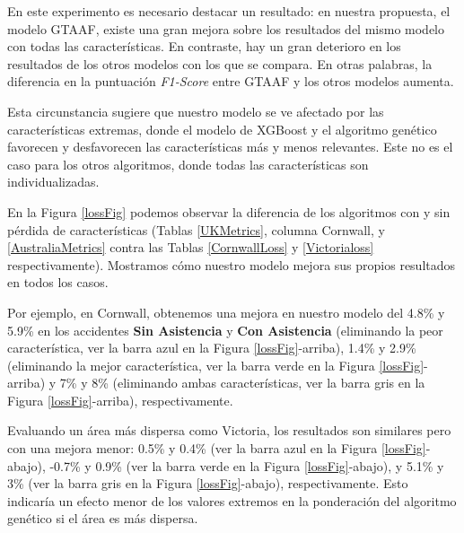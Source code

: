 En este experimento es necesario destacar un resultado: en nuestra propuesta, el modelo GTAAF, existe una gran mejora sobre los resultados del mismo modelo con todas las características. En contraste, hay un gran deterioro en los resultados de los otros modelos con los que se compara. En otras palabras, la diferencia en la puntuación \textit{F1-Score} entre GTAAF y los otros modelos aumenta.

Esta circunstancia sugiere que nuestro modelo se ve afectado por las características extremas, donde el modelo de XGBoost y el algoritmo genético favorecen y desfavorecen las características más y menos relevantes. Este no es el caso para los otros algoritmos, donde todas las características son individualizadas.

En la Figura \ref{lossFig} podemos observar la diferencia de los algoritmos con y sin pérdida de características (Tablas \ref{UKMetrics}, columna Cornwall, y \ref{AustraliaMetrics} contra las Tablas \ref{CornwallLoss} y \ref{Victorialoss} respectivamente). Mostramos cómo nuestro modelo mejora sus propios resultados en todos los casos.

Por ejemplo, en Cornwall, obtenemos una mejora en nuestro modelo del 4.8\% y 5.9\% en los accidentes \textbf{Sin Asistencia} y \textbf{Con Asistencia} (eliminando la peor característica, ver la barra azul en la Figura \ref{lossFig}-arriba), 1.4\% y 2.9\% (eliminando la mejor característica, ver la barra verde en la Figura \ref{lossFig}-arriba) y 7\% y 8\% (eliminando ambas características, ver la barra gris en la Figura \ref{lossFig}-arriba), respectivamente.

Evaluando un área más dispersa como Victoria, los resultados son similares pero con una mejora menor: 0.5\% y 0.4\% (ver la barra azul en la Figura \ref{lossFig}-abajo), -0.7\% y 0.9\% (ver la barra verde en la Figura \ref{lossFig}-abajo), y 5.1\% y 3\% (ver la barra gris en la Figura \ref{lossFig}-abajo), respectivamente. Esto indicaría un efecto menor de los valores extremos en la ponderación del algoritmo genético si el área es más dispersa.

